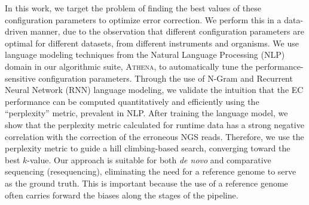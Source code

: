  In this work, we target the problem of finding the best values of these configuration parameters to optimize error correction.
We perform this in a data-driven manner, due to the observation that different configuration parameters are optimal for different datasets, \ie from different instruments and organisms. 
We use language modeling techniques from the Natural Language Processing (NLP) domain in our algorithmic suite, \textsc{Athena}, to automatically tune the performance-sensitive configuration parameters. Through the use of N-Gram and Recurrent Neural Network (RNN) language modeling, we validate the intuition that the EC performance can be computed quantitatively and efficiently using the ``perplexity'' metric, prevalent in NLP. After training the language model, we show that the perplexity metric calculated for runtime data has a strong negative correlation with the correction of the erroneous NGS reads. Therefore, we use the perplexity metric to guide a hill climbing-based search, converging toward the best $k$-value. Our approach is suitable for both \textit{de novo} and comparative sequencing (resequencing), eliminating the need for a reference genome to serve as the ground truth. This is important because the use of a reference genome often carries forward the biases along the stages of the pipeline. %
